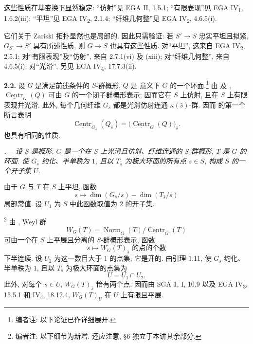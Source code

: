 这些性质在基变换下显然稳定: “仿射”见 EGA II, 1.5.1; “有限表现”见 EGA IV\textsubscript{1}, 1.6.2(iii); “平坦”见 EGA IV\textsubscript{2}, 2.1.4; “纤维几何整”见 EGA IV\textsubscript{2}, 4.6.5(i).

它们关于 Zariski 拓扑显然也是局部的. 因此只需验证: 若 \(S'\longrightarrow S\) 忠实平坦且拟紧, \(G_{S'}\longrightarrow S'\) 具有所述性质, 则 \(G\longrightarrow S\) 也具有这些性质. 对“平坦”, 这来自 EGA IV\textsubscript{2}, 2.5.1; 对“有限表现”及“仿射”, 来自 2.7.1(vi) 及 (xiii); 对“纤维几何整”, 来自 4.6.5(i); 对“光滑”, 另见 EGA IV\textsubscript{4}, 17.7.3(ii).

\par\medskip\noindent{}\textbf{2.2.}\quad
设 \(G\) 是满足前述条件的 \(S\)-群概形, \(Q\) 是 意义下 \(G\) 的一个环面.\footnote{编者注: 以下论证已作详细展开.}
由 及 , \(\underline{\operatorname{Centr}}_{G}(Q)\) 可由 \(G\) 的一个闭子群概形表示; 因而它在 \(S\) 上仿射, 且在 \(S\) 上有限表现并光滑. 此外, 每个几何纤维 \(G_{\bar s}\) 都是光滑仿射连通 \(\kappa(\bar s)\)-群. 因而  的第一个断言表明
\[
  \underline{\operatorname{Centr}}_{G_{\bar s}}(Q_{\bar s})
  =
  \bigl(\underline{\operatorname{Centr}}_{G}(Q)\bigr)_{\bar s}.
\]
也具有相同的性质.

\par\medskip\noindent
{}\textbf{\textit{.}}---
\textit{设 \(S\) 是概形, \(G\) 是一个在 \(S\) 上光滑且仿射、纤维连通的 \(S\)-群概形, \(T\) 是 \(G\) 的环面. 使 \(G_{\bar s}\) 约化、半单秩为 \(1\), 且以 \(T_{\bar s}\) 为极大环面的所有点 \(s\in S\), 构成 \(S\) 的一个开子集 \(U\).}

由于 \(G\) 与 \(T\) 在 \(S\) 上平坦, 函数
\[
  s
  \longmapsto
  \dim(G_{\bar s}/\bar s)-\dim(T_{\bar s}/\bar s)
\]
局部常值. 设 \(U_1\) 为 \(S\) 中此函数取值为 \(2\) 的开子集.

\footnote{编者注: 以下细节为新增. 还应注意, §6 独立于本讲其余部分.}
由 , Weyl 群
\[
  W_G(T)
  =
  \underline{\operatorname{Norm}}_{G}(T)/
  \underline{\operatorname{Centr}}_{G}(T)
\]
可由一个在 \(S\) 上平展且分离的 \(S\)-群概形表示, 函数
\[
  s\longmapsto
  \text{\(W_G(T)_{\bar s}\) 的点的个数}
\]
下半连续. 设 \(U_2\) 为这一数目大于 \(1\) 的点集; 它是开的. 由引理 1.11, 使 \(G_{\bar s}\) 约化、半单秩为 \(1\), 且以 \(T_{\bar s}\) 为极大环面的点集为
\[
  U=U_1\cap U_2.
\]
此外, 对每个 \(s\in U\), \(W_G(T)_{\bar s}\) 恰有两个点. 因而由 SGA 1, I, 10.9 以及 EGA IV\textsubscript{3}, 15.5.1 和 IV\textsubscript{4}, 18.12.4, \(W_G(T)_U\) 在 \(U\) 上有限且平展.

